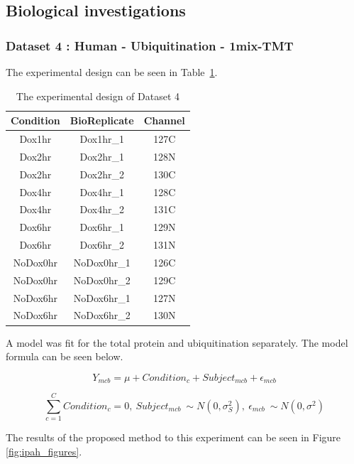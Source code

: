 \documentclass{mcp}
\begin{document}
\clearpage
\subsection{Biological investigations}
\label{sec:bio_investigations}

\subsubsection{Dataset 4 : Human - Ubiquitination - 1mix-TMT~\cite{LUCHETTI2021}}
\label{sec:ipah}

The experimental design can be seen in Table~\ref{table:ipah_design}.

\begin{table}[h!]
\centering
\begin{tabular}{| c | c | c |}
\hline
 Condition & BioReplicate & Channel \\ [0.5ex]
 \hline\hline
 Dox1hr & Dox1hr\_1 & 127C\\
 \hline
 Dox2hr & Dox2hr\_1 & 128N\\
\hline
 Dox2hr & Dox2hr\_2 & 130C\\
\hline
 Dox4hr & Dox4hr\_1 & 128C\\
\hline
 Dox4hr & Dox4hr\_2 & 131C\\
\hline
 Dox6hr & Dox6hr\_1 & 129N\\
\hline
 Dox6hr & Dox6hr\_2 & 131N\\
\hline
 NoDox0hr & NoDox0hr\_1 & 126C\\
\hline
 NoDox0hr & NoDox0hr\_2 & 129C\\
\hline
 NoDox6hr & NoDox6hr\_1 & 127N\\
\hline
 NoDox6hr & NoDox6hr\_2 & 130N\\
\hline

\end{tabular}
\caption{The experimental design of Dataset 4}
\label{table:ipah_design}
\end{table}

A model was fit for the total protein and ubiquitination separately. The model formula can be seen below.

$$Y_{mcb} = \mu + Condition_c + Subject_{mcb} + \epsilon_{mcb}$$

$$\sum_{c=1}^C{Condition_c} = 0 ,\: Subject_{mcb} ~ \sim N(0, \sigma^2_S) ,\: \epsilon_{mcb} ~ \sim N(0, \sigma^2)$$

The results of the proposed method to this experiment can be seen in Figure \ref{fig:ipah_figures}.
\end{document}

